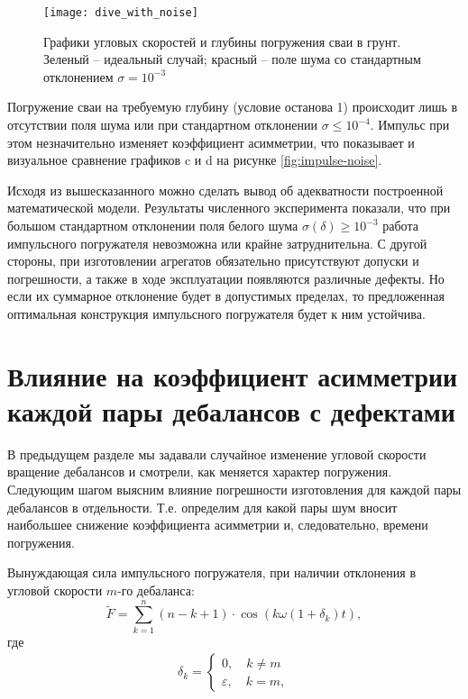 \begin{figure}[ht]
    \centering
    \texttt{[image: dive\_with\_noise]}
    \caption{Графики угловых скоростей и глубины погружения сваи в грунт.
    Зеленый -- идеальный случай; красный -- поле шума со стандартным отклонением $\sigma = 10^{-3}$}
    \label{fig:dive_with_noise}
\end{figure}

Погружение сваи на требуемую глубину (условие останова 1) происходит лишь в отсутствии поля шума или
при стандартном отклонении $\sigma \leq 10^{-4}$. Импульс при этом незначительно изменяет коэффициент асимметрии,
что показывает и визуальное сравнение графиков c и d на рисунке \ref{fig:impulse-noise}.

Исходя из вышесказанного можно сделать вывод об адекватности построенной математической модели. Результаты численного
эксперимента показали, что при большом стандартном отклонении поля белого шума $\sigma(\delta) \geq 10^{-3}$ работа
импульсного погружателя невозможна или крайне затруднительна. С другой стороны, при изготовлении агрегатов обязательно
присутствуют допуски и погрешности, а также в ходе эксплуатации появляются различные дефекты. Но если их суммарное отклонение
будет в допустимых пределах, то предложенная оптимальная конструкция импульсного погружателя будет к ним устойчива.

\section{Влияние на коэффициент асимметрии каждой пары дебалансов с дефектами}

В предыдущем разделе мы задавали случайное изменение угловой скорости вращение дебалансов и смотрели, как меняется характер погружения.
Следующим шагом выясним влияние погрешности изготовления для каждой пары дебалансов в отдельности. Т.е. определим для какой пары шум вносит
наибольшее снижение коэффициента асимметрии и, следовательно, времени погружения.

Вынуждающая сила импульсного погружателя, при наличии отклонения в угловой скорости $m$-го дебаланса:
\begin{equation}
    \label{eq:F_noise_one_deb}
    \widetilde{F} = \sum\limits_{k = 1}^n (n - k + 1) \cdot \cos (k \omega (1 + \delta_k) t),
\end{equation}
где
\begin{equation}
    \begin{aligned}
        \delta_k =
        \begin{cases}
            0, \quad k \neq m \\
            \varepsilon, \quad k = m,
        \end{cases}
    \end{aligned}
\end{equation}

